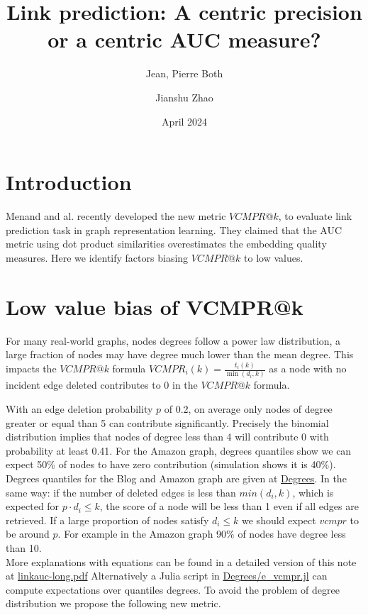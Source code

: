 \documentclass{article}
\title{Link prediction: A centric precision or a centric AUC measure?}
\author[1,*]{Jean, Pierre Both}
\author[2]{Jianshu Zhao}
\affil[1]{Université Paris-Saclay, CEA, List, Palaiseau, France. (Retired)}
\affil[2]{Center for Bioinformatics and Computational Genomics, Georgia Institute of Technology, Atlanta, Georgia, USA}
\affil[*]{Corresponding author : jeanpierre.both@gmail.com}
\date{April 2024}
\begin{document}
\maketitle

\section{Introduction}

Menand and al. \cite{Menand2024link} recently developed the new metric $VCMPR@k$, to evaluate link prediction task in graph representation learning.
They claimed that the AUC metric using dot product similarities overestimates the embedding quality measures.
Here we identify factors biasing $VCMPR@k$ to low values.


\section{Low value bias of VCMPR@k}
For many real-world graphs, nodes degrees follow a power law distribution, a large fraction of nodes may have degree much lower than the mean degree.
This impacts the $VCMPR@k$ formula $ VCMPR_{i}(k)= \frac{t_{i}(k)}{\min(d_{i},k)}$ as a node with no incident edge deleted contributes to 0 in the $VCMPR@k$ formula.

With an edge deletion probability $p$ of 0.2, on average only nodes of degree greater or equal than 5 can contribute significantly. Precisely the binomial distribution implies that nodes of degree less than 4 will contribute 0 with probability at least 0.41.
For the Amazon graph, degrees quantiles show we can expect 50\% of nodes to have zero contribution (simulation shows it is 40\%).
Degrees quantiles for the Blog and Amazon graph are given at \href{https://github.com/jean-pierreBoth/linkauc/tree/master/Degrees}{\color{blue}Degrees}.
In the same way: if the number of deleted edges is less than $min(d_{i},k)$, which is expected for $p \cdot d_{i} \leq k$, the score of a node will be less than 1 even if all edges are retrieved.
If a large proportion of nodes satisfy $d_{i} \le k$ we should expect $vcmpr$ to be around $p$. For example in the Amazon graph 90\% of nodes have degree less than 10.\\
More explanations with equations can be found in a detailed version of this note at \href{https://github.com/jean-pierreBoth/linkauc/tree/master/Latex}{\color{blue}linkauc-long.pdf}
Alternatively a Julia script in \href{https://github.com/jean-pierreBoth/linkauc/tree/master/Degrees}{\color{blue}Degrees/e\_vcmpr.jl} can compute expectations over quantiles degrees.
To avoid the problem of degree distribution we propose the following new metric.
\end{document}
